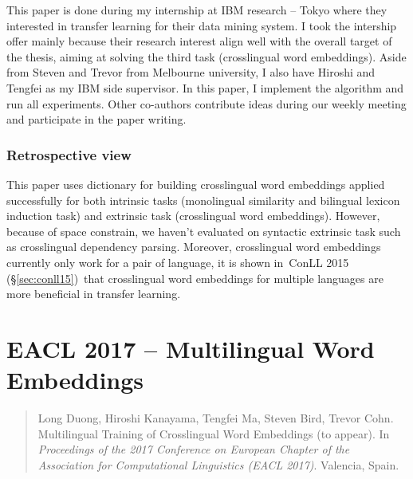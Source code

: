 \documentclass[12pt,twoside,final,hidelinks]{ltthesis}
\theoremstyle{definition}
\newcommand\conllv{ConLL 2015 (\S\ref{sec:conll15})}
\begin{document}
This paper is done during my internship at IBM research -- Tokyo where they interested in transfer learning for their data mining system. I took the 
intership offer mainly because their research interest align well with the overall target of the thesis, aiming at solving the third task (crosslingual 
word embeddings). Aside from Steven and Trevor from Melbourne university, I also have Hiroshi and Tengfei as my IBM side supervisor. In this paper, I implement the algorithm and run all experiments. Other co-authors contribute ideas during our weekly meeting and participate in the paper writing. 

\subsubsection{Retrospective view}
This paper uses dictionary for building crosslingual word embeddings applied successfully for both intrinsic tasks (monolingual similarity and bilingual lexicon
induction task) and extrinsic task (crosslingual word embeddings). However, because of space constrain, we haven't evaluated on syntactic extrinsic task such as 
crosslingual dependency parsing. Moreover, crosslingual word embeddings currently only work for a pair of language, it is shown in~\conllv\ that crosslingual word embeddings for multiple languages are more beneficial in transfer learning. 




\section{EACL 2017 -- Multilingual Word Embeddings}
\label{sec:eacl17}
\begin{quote}
Long Duong, Hiroshi Kanayama, Tengfei Ma, Steven Bird, Trevor Cohn. Multilingual Training of Crosslingual Word Embeddings (to appear). In \textit{Proceedings of the 2017 Conference on European Chapter of the Association for Computational Linguistics (EACL 2017)}. Valencia, Spain. 
\end{quote}
\end{document}
